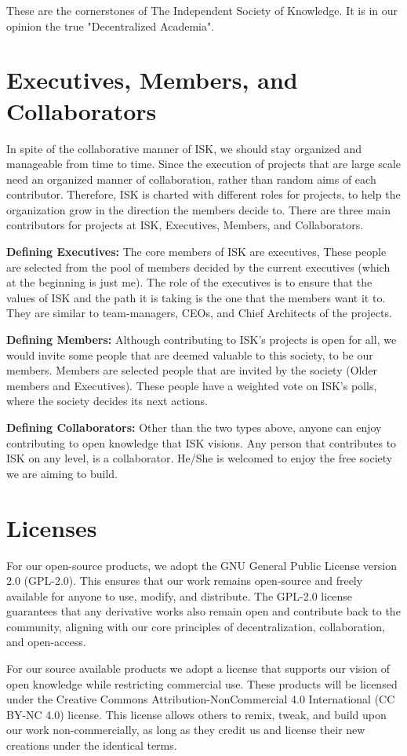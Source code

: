 \documentclass[10pt]{article}
\begin{document}
These are the cornerstones of The Independent Society of Knowledge.
It is in our opinion the true "Decentralized Academia".

\section{Executives, Members, and Collaborators}
In spite of the collaborative manner of ISK, we should stay organized and manageable from time to time.
Since the execution of projects that are large scale need an organized manner of collaboration, rather than random aims of each contributor.
Therefore, ISK is charted with different roles for projects, to help the organization grow in the direction the members decide to.
There are three main contributors for projects at ISK, Executives, Members, and Collaborators.

\textbf{Defining Executives:} The core members of ISK are executives, These people are selected from the pool of members decided by the current executives (which at the beginning is just me).
The role of the executives is to ensure that the values of ISK and the path it is taking is the one that the members want it to.
They are similar to team-managers, CEOs, and Chief Architects of the projects.

\textbf{Defining Members:} Although contributing to ISK's projects is open for all, we would invite some people that are deemed valuable to this society, to be our members.
Members are selected people that are invited by the society (Older members and Executives).
These people have a weighted vote on ISK's polls, where the society decides its next actions.

\textbf{Defining Collaborators:} Other than the two types above, anyone can enjoy contributing to open knowledge that ISK visions.
Any person that contributes to ISK on any level, is a collaborator.
He/She is welcomed to enjoy the free society we are aiming to build.

\section{Licenses}
For our open-source products, we adopt the GNU General Public License version 2.0 (GPL-2.0). This ensures that our work remains open-source and freely available for anyone to use, modify, and distribute. The GPL-2.0 license guarantees that any derivative works also remain open and contribute back to the community, aligning with our core principles of decentralization, collaboration, and open-access.

For our source available products we adopt a license that supports our vision of open knowledge while restricting commercial use. These products will be licensed under the Creative Commons Attribution-NonCommercial 4.0 International (CC BY-NC 4.0) license. This license allows others to remix, tweak, and build upon our work non-commercially, as long as they credit us and license their new creations under the identical terms.
\end{document}
